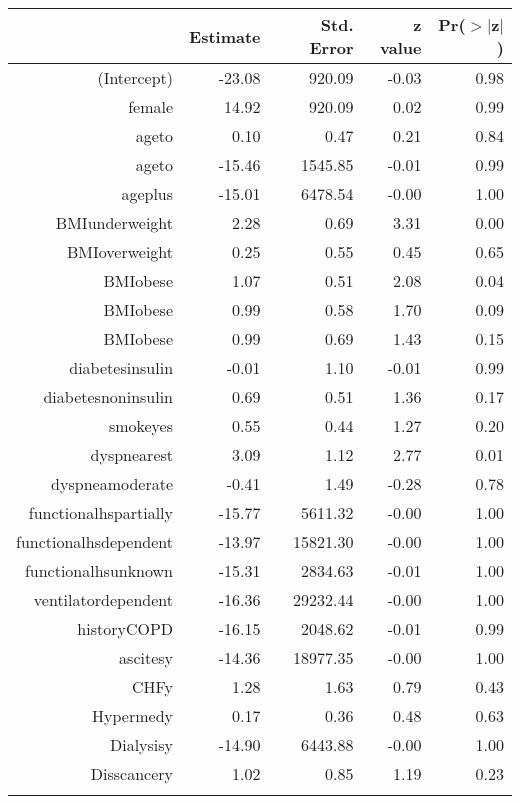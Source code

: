 \bigskip\bigskip
\centering
\begin{tabular}{rrrrr}
  \hline
 & Estimate & Std. Error & z value & Pr($>$$|$z$|$) \\ 
  \hline
(Intercept) & -23.08 & 920.09 & -0.03 & 0.98 \\ 
  female & 14.92 & 920.09 & 0.02 & 0.99 \\ 
  age\-65\-to\-74 & 0.10 & 0.47 & 0.21 & 0.84 \\ 
  age\-75\-to\-84 & -15.46 & 1545.85 & -0.01 & 0.99 \\ 
  age\-85\-plus & -15.01 & 6478.54 & -0.00 & 1.00 \\ 
  BMI\-underweight & 2.28 & 0.69 & 3.31 & 0.00 \\ 
  BMI\-overweight & 0.25 & 0.55 & 0.45 & 0.65 \\ 
  BMI\-obese\-1 & 1.07 & 0.51 & 2.08 & 0.04 \\ 
  BMI\-obese\-2 & 0.99 & 0.58 & 1.70 & 0.09 \\ 
  BMI\-obese\-3 & 0.99 & 0.69 & 1.43 & 0.15 \\ 
  diabetes\-insulin & -0.01 & 1.10 & -0.01 & 0.99 \\ 
  diabetes\-noninsulin & 0.69 & 0.51 & 1.36 & 0.17 \\ 
  smoke\-yes & 0.55 & 0.44 & 1.27 & 0.20 \\ 
  dyspnea\-rest & 3.09 & 1.12 & 2.77 & 0.01 \\ 
  dyspnea\-moderate & -0.41 & 1.49 & -0.28 & 0.78 \\ 
  functional\-hs\-partially & -15.77 & 5611.32 & -0.00 & 1.00 \\ 
  functional\-hs\-dependent & -13.97 & 15821.30 & -0.00 & 1.00 \\ 
  functional\-hs\-unknown & -15.31 & 2834.63 & -0.01 & 1.00 \\ 
  ventilator\-dependent & -16.36 & 29232.44 & -0.00 & 1.00 \\ 
  history\-COPD & -16.15 & 2048.62 & -0.01 & 0.99 \\ 
  ascites\-y & -14.36 & 18977.35 & -0.00 & 1.00 \\ 
  CHF\-y & 1.28 & 1.63 & 0.79 & 0.43 \\ 
  Hyper\-med\-y & 0.17 & 0.36 & 0.48 & 0.63 \\ 
  Dialysis\-y & -14.90 & 6443.88 & -0.00 & 1.00 \\ 
  Diss\-cancer\-y & 1.02 & 0.85 & 1.19 & 0.23 \\ 
$$
\end{tabular}
